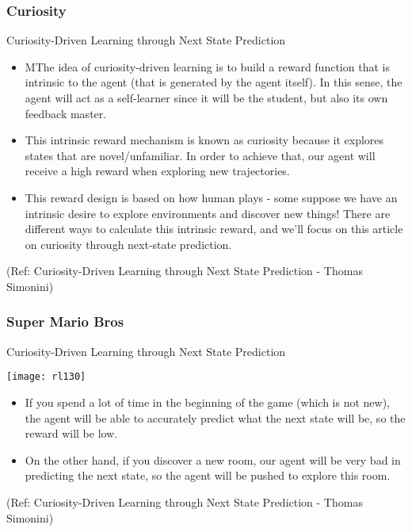 \begin{frame}[fragile]\frametitle{Curiosity}
Curiosity-Driven Learning through Next State Prediction


\begin{itemize}
\item MThe idea of curiosity-driven learning is to build a reward function that is intrinsic to the agent (that is generated by the agent itself). In this sense, the agent will act as a self-learner since it will be the student, but also its own feedback master.
\item This intrinsic reward mechanism is known as curiosity because it explores states that are novel/unfamiliar. In order to achieve that, our agent will receive a high reward when exploring new trajectories.
\item This reward design is based on how human plays - some suppose we have an intrinsic desire to explore environments and discover new things! There are different ways to calculate this intrinsic reward, and we'll focus on this article on curiosity through next-state prediction.
\end{itemize}

{\tiny (Ref: Curiosity-Driven Learning through Next State Prediction - Thomas Simonini)}


\end{frame}


\begin{frame}[fragile]\frametitle{Super Mario Bros}
Curiosity-Driven Learning through Next State Prediction

\begin{center}
\texttt{[image: rl130]}
\end{center}

\begin{itemize}
\item If you spend a lot of time in the beginning of the game (which is not new), the agent will be able to accurately predict what the next state will be, so the reward will be low.
\item  On the other hand, if you discover a new room, our agent will be very bad in predicting the next state, so the agent will be pushed to explore this room.
\end{itemize}

{\tiny (Ref: Curiosity-Driven Learning through Next State Prediction - Thomas Simonini)}


\end{frame}

